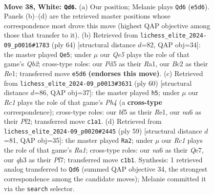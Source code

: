 \documentclass[11pt]{article}
\begin{document}
\clearpage

\begin{figure}[p]\centering
\begin{subfigure}{0.46\textwidth}\centering
\resizebox{\linewidth}{!}{%
\newchessgame
\chessboard[
  setfen={r5k1/pp6/n5p1/2pPQbp1/8/P4PPq/1PB5/2RR2K1 w - - 1 38},
  showmover=false,
  pgfstyle=straightmove, color=movearrow, markmove={e5-d6}
]}
\caption{}
\end{subfigure}\hfill
\begin{subfigure}{0.46\textwidth}\centering
\resizebox{\linewidth}{!}{%
\newchessgame
\chessboard[
  setfen={2r5/5k2/7p/p7/1bp1n1p1/3bP1B1/1Q3PPK/R3R3 w - - 6 33},
  showmover=false,
  pgfstyle=straightmove, color=movearrow, markmove={b2-e5}
]}
\caption{}
\end{subfigure}
\\[4pt]
\begin{subfigure}{0.46\textwidth}\centering
\resizebox{\linewidth}{!}{%
\newchessgame
\chessboard[
  setfen={3r1k2/6p1/p1bbR1Q1/1p1p4/1P5P/P1q5/5PP1/4R1K1 w - - 1 31},
  showmover=false,
  pgfstyle=straightmove, color=movearrow, markmove={h4-h5}
]}
\caption{}
\end{subfigure}\hfill
\begin{subfigure}{0.46\textwidth}\centering
\resizebox{\linewidth}{!}{%
\newchessgame
\chessboard[
  setfen={r3r1k1/4qpp1/1bp4p/1p1b4/1P3PP1/3R1BNP/2Q4K/5R2 b - - 6 30},
  showmover=false,
  pgfstyle=straightmove, color=movearrow, markmove={a8-a2}
]}
\caption{}
\end{subfigure}
\caption{\textbf{Move 38, White: \texttt{Qd6}.} (a) Our position; Melanie plays \texttt{Qd6} (\texttt{e5d6}). Panels (b)--(d) are the retrieved master positions whose correspondence most drove this move (highest QAP objective among those that transfer to it). (b) Retrieved from \texttt{lichess\_elite\_2024-09\_p0016\#1783} (ply 64) [structural distance $d$=82, QAP obj=34]: the master played \texttt{Qe5}; under $\mu$ our \emph{Qe5} plays the role of that game's \emph{Qb2}; cross-type roles: our \emph{P}d5 as their \emph{R}a1, our \emph{B}c2 as their \emph{R}e1; transferred move \texttt{e5d6} \textbf{(endorses this move)}. (c) Retrieved from \texttt{lichess\_elite\_2024-09\_p0013\#3631} (ply 60) [structural distance $d$=86, QAP obj=37]: the master played \texttt{h5}; under $\mu$ our \emph{Rc1} plays the role of that game's \emph{Ph4} (a \textbf{cross-type} correspondence); cross-type roles: our \emph{b}f5 as their \emph{R}e1, our \emph{n}a6 as their \emph{P}f2; transferred move \texttt{c1a1}. (d) Retrieved from \texttt{lichess\_elite\_2024-09\_p0020\#2445} (ply 59) [structural distance $d$=81, QAP obj=35]: the master played \texttt{Ra2}; under $\mu$ our \emph{Rc1} plays the role of that game's \emph{Ra1}; cross-type roles: our \emph{n}a6 as their \emph{Q}e7, our \emph{q}h3 as their \emph{P}f7; transferred move \texttt{c1b1}. Synthesis: 1 retrieved analog transferred to \texttt{Qd6} (summed QAP objective 34, the strongest correspondence among the candidate moves); Melanie committed it via the \texttt{search} selector.}
\label{fig:thought-m74}
\end{figure}
\end{document}
